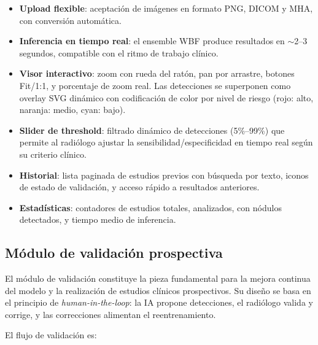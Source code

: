 \documentclass[conference]{IEEEtran}
\begin{document}
\begin{itemize}
\item \textbf{Upload flexible}: aceptaci\'{o}n de im\'{a}genes en formato
PNG, DICOM y MHA, con conversi\'{o}n autom\'{a}tica.
\item \textbf{Inferencia en tiempo real}: el ensemble WBF produce resultados
en $\sim$2--3 segundos, compatible con el ritmo de trabajo cl\'{i}nico.
\item \textbf{Visor interactivo}: zoom con rueda del rat\'{o}n, pan por
arrastre, botones Fit/1:1, y porcentaje de zoom real. Las detecciones se
superponen como overlay SVG din\'{a}mico con codificaci\'{o}n de color por
nivel de riesgo (rojo: alto, naranja: medio, cyan: bajo).
\item \textbf{Slider de threshold}: filtrado din\'{a}mico de detecciones
(5\%--99\%) que permite al radi\'{o}logo ajustar la sensibilidad/especificidad
en tiempo real seg\'{u}n su criterio cl\'{i}nico.
\item \textbf{Historial}: lista paginada de estudios previos con
b\'{u}squeda por texto, iconos de estado de validaci\'{o}n, y acceso
r\'{a}pido a resultados anteriores.
\item \textbf{Estad\'{i}sticas}: contadores de estudios totales, analizados,
con n\'{o}dulos detectados, y tiempo medio de inferencia.
\end{itemize}


\subsection{M\'{o}dulo de validaci\'{o}n prospectiva}

El m\'{o}dulo de validaci\'{o}n constituye la pieza fundamental para la mejora
continua del modelo y la realizaci\'{o}n de estudios cl\'{i}nicos
prospectivos. Su dise\~{n}o se basa en el principio de
\textit{human-in-the-loop}: la IA propone detecciones, el radi\'{o}logo valida
y corrige, y las correcciones alimentan el reentrenamiento.

El flujo de validaci\'{o}n es:
\end{document}
